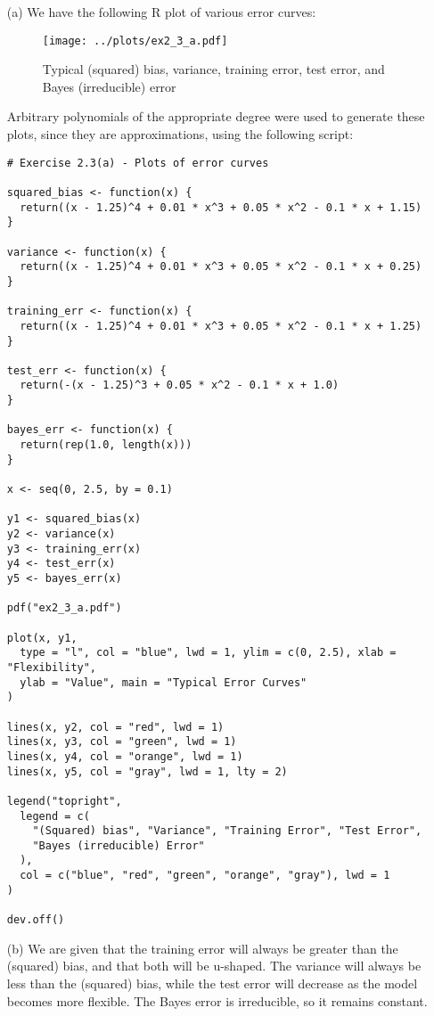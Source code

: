 
\begin{itemize}
    \item[(a)] We have the following R plot of various error curves:
    \begin{figure}[!ht]
        \texttt{[image: ../plots/ex2\_3\_a.pdf]}
        \caption{
            Typical (squared) bias, variance, training error, test error, and Bayes 
            (irreducible) error
        }\label{fig:figure1}
    \end{figure}
    Arbitrary polynomials of the appropriate degree were used to generate these 
    plots, since they are approximations, using the following script:
    \begin{verbatim}
# Exercise 2.3(a) - Plots of error curves

squared_bias <- function(x) {
  return((x - 1.25)^4 + 0.01 * x^3 + 0.05 * x^2 - 0.1 * x + 1.15)
}

variance <- function(x) {
  return((x - 1.25)^4 + 0.01 * x^3 + 0.05 * x^2 - 0.1 * x + 0.25)
}

training_err <- function(x) {
  return((x - 1.25)^4 + 0.01 * x^3 + 0.05 * x^2 - 0.1 * x + 1.25)
}

test_err <- function(x) {
  return(-(x - 1.25)^3 + 0.05 * x^2 - 0.1 * x + 1.0)
}

bayes_err <- function(x) {
  return(rep(1.0, length(x)))
}

x <- seq(0, 2.5, by = 0.1)

y1 <- squared_bias(x)
y2 <- variance(x)
y3 <- training_err(x)
y4 <- test_err(x)
y5 <- bayes_err(x)

pdf("ex2_3_a.pdf")

plot(x, y1,
  type = "l", col = "blue", lwd = 1, ylim = c(0, 2.5), xlab = "Flexibility",
  ylab = "Value", main = "Typical Error Curves"
)

lines(x, y2, col = "red", lwd = 1)
lines(x, y3, col = "green", lwd = 1)
lines(x, y4, col = "orange", lwd = 1)
lines(x, y5, col = "gray", lwd = 1, lty = 2)

legend("topright",
  legend = c(
    "(Squared) bias", "Variance", "Training Error", "Test Error",
    "Bayes (irreducible) Error"
  ),
  col = c("blue", "red", "green", "orange", "gray"), lwd = 1
)

dev.off()

    \end{verbatim}
  \item[(b)] We are given that the training error will always be greater than
  the (squared) bias, and that both will be u-shaped. The variance will always
  be less than the (squared) bias, while the test error will decrease as the model
  becomes more flexible. The Bayes error is irreducible, so it remains constant.
\end{itemize}
